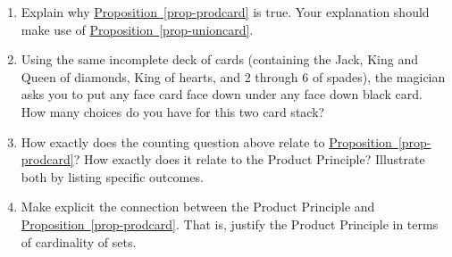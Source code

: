 \documentclass{book}
\begin{document}
\setcounter{project}{82}
\addtocounter{project}{-1}
\begin{activity}[]\label{activity-75}
\leavevmode%
\begin{enumerate}[font=\bfseries,label=(\alph*),ref=\alph*]
\item\label{task-121} \hypertarget{p-639}{}%
Explain why \hyperref[prop-prodcard]{Proposition~\ref{prop-prodcard}} is true.  Your explanation should make use of \hyperref[prop-unioncard]{Proposition~\ref{prop-unioncard}}.%
\item\label{task-122} \hypertarget{p-640}{}%
Using the same incomplete deck of cards (containing the Jack, King and Queen of diamonds, King of hearts, and 2 through 6 of spades), the magician asks you to put any face card face down under any face down black card.  How many choices do you have for this two card stack?%
\item\label{task-123} \hypertarget{p-641}{}%
How exactly does the counting question above relate to \hyperref[prop-prodcard]{Proposition~\ref{prop-prodcard}}?  How exactly does it relate to the Product Principle?  Illustrate both by listing specific outcomes.%
\item\label{task-124} \hypertarget{p-642}{}%
Make explicit the connection between the Product Principle and \hyperref[prop-prodcard]{Proposition~\ref{prop-prodcard}}.  That is, justify the Product Principle in terms of cardinality of sets.%
\end{enumerate}
\end{activity}
\end{document}
